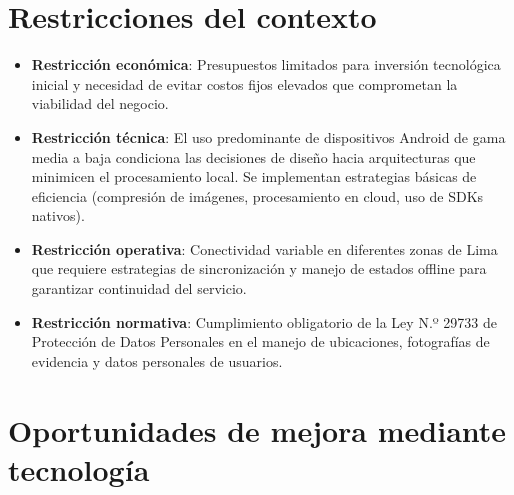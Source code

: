\section{Restricciones del contexto}

\begin{itemize}
    \item \textbf{Restricción económica}: Presupuestos limitados para inversión tecnológica inicial y necesidad de evitar costos fijos elevados que comprometan la viabilidad del negocio.
    
    \item \textbf{Restricción técnica}: El uso predominante de dispositivos Android de gama media a baja condiciona las decisiones de diseño hacia arquitecturas que minimicen el procesamiento local. Se implementan estrategias básicas de eficiencia (compresión de imágenes, procesamiento en cloud, uso de SDKs nativos).
    
    \item \textbf{Restricción operativa}: Conectividad variable en diferentes zonas de Lima que requiere estrategias de sincronización y manejo de estados offline para garantizar continuidad del servicio.
    
    \item \textbf{Restricción normativa}: Cumplimiento obligatorio de la Ley N.º 29733 de Protección de Datos Personales en el manejo de ubicaciones, fotografías de evidencia y datos personales de usuarios.
\end{itemize}

\section{Oportunidades de mejora mediante tecnología}

